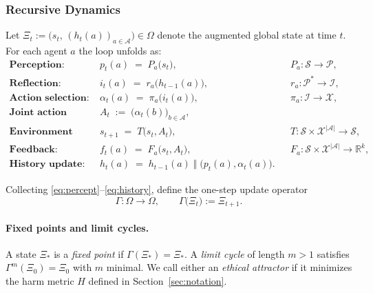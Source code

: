 \subsubsection{Recursive Dynamics}
\label{sec:rec-dyn}

Let $\Xi_t := \bigl(s_t,\, (h_t(a))_{a \in \mathcal{A}}\bigr) \in \Omega$
denote the augmented global state at time $t$.
For each agent $a$ the loop unfolds as:                         %
\begin{align}
\textbf{Perception:}\qquad
 & p_t(a) \;=\; P_a\bigl(s_t\bigr),
           && P_a : \mathcal{S} \to \mathcal{P},
           \label{eq:percept} \\[2pt]
\textbf{Reflection:}\qquad
 & i_t(a) \;=\; r_a\!\bigl(h_{t-1}(a)\bigr),
           && r_a : \mathcal{P}^{*} \to \mathcal{I},
           \label{eq:reflect} \\[2pt]
\textbf{Action selection:}\qquad
 & \alpha_t(a) \;=\; \pi_a\!\bigl(i_t(a)\bigr),
           && \pi_a : \mathcal{I} \to \mathcal{X},
           \label{eq:action} \\[2pt]
\textbf{Joint action vector:}\qquad
 & A_t \;:=\; \bigl(\alpha_t(b)\bigr)_{b \in \mathcal{A}}, \label{eq:joint}\\[2pt]
\textbf{Environment transition:}\qquad
 & s_{t+1} \;=\; T\!\bigl(s_t, A_t\bigr),
           && T : \mathcal{S}\!\times\!\mathcal{X}^{|\mathcal{A}|}\!\to\!\mathcal{S},
           \label{eq:transition} \\[2pt]
\textbf{Feedback:}\qquad
 & f_t(a) \;=\; F_a\!\bigl(s_t, A_t\bigr),
           && F_a : \mathcal{S}\!\times\!\mathcal{X}^{|\mathcal{A}|}\!\to\!\mathbb{R}^k,
           \label{eq:feedback} \\[2pt]
\textbf{History update:}\qquad
 & h_t(a) \;=\; h_{t-1}(a)\;\Vert\;\bigl(p_t(a), \alpha_t(a)\bigr).
           \label{eq:history}
\end{align}

\vspace{.5em}
\noindent
Collecting \eqref{eq:percept}–\eqref{eq:history},
define the one-step update operator
\[
   \Gamma : \Omega \longrightarrow \Omega,
   \qquad
   \Gamma\!\bigl(\Xi_t\bigr) := \Xi_{t+1}.
\]

\paragraph{Fixed points and limit cycles.}
A state $\Xi_\ast$ is a \emph{fixed point} if
$\Gamma(\Xi_\ast)=\Xi_\ast$.
A \emph{limit cycle} of length $m>1$ satisfies
$\Gamma^{m}(\Xi_0)=\Xi_0$ with $m$ minimal.
We call either an \emph{ethical attractor}
if it minimizes the harm metric $H$ defined in Section~\ref{sec:notation}.

